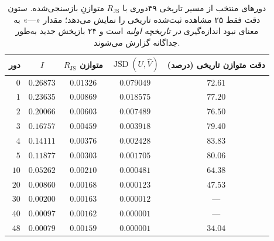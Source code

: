 \begin{table}[htbp]
\centering\small
\caption{دورهای منتخب از مسیر تاریخی ۴۹دوری با $R_{\mathrm{JS}}$ متوازنِ بازسنجی‌شده. ستون دقت فقط ۲۵ مشاهده ثبت‌شده تاریخی را نمایش می‌دهد؛ مقدار «---» به معنای نبود اندازه‌گیری \emph{در تاریخچه اولیه} است و ۲۴ بازپخش جدید به‌طور جداگانه گزارش می‌شوند.}
\label{tab:ch4-center-trajectory-selected}
\begin{tabular}{rcccc}\hline
دور & $I$ & $R_{\mathrm{JS}}$ متوازن & $\overline{\operatorname{JSD}}(U,\widehat V)$ & دقت متوازن تاریخی (درصد)\\\hline
$0$ & $0.26873$ & $0.01326$ & $0.079049$ & $72.61$\\
$1$ & $0.23635$ & $0.00869$ & $0.018575$ & $77.20$\\
$2$ & $0.20066$ & $0.00603$ & $0.007489$ & $76.50$\\
$3$ & $0.16757$ & $0.00459$ & $0.003918$ & $79.40$\\
$4$ & $0.14111$ & $0.00376$ & $0.002428$ & $83.83$\\
$5$ & $0.11877$ & $0.00303$ & $0.001705$ & $80.06$\\
$10$ & $0.05262$ & $0.00210$ & $0.000481$ & $64.38$\\
$20$ & $0.00860$ & $0.00168$ & $0.000123$ & $47.53$\\
$30$ & $0.00200$ & $0.00163$ & $0.000012$ & ---\\
$40$ & $0.00097$ & $0.00162$ & $0.000001$ & ---\\
$48$ & $0.00079$ & $0.00159$ & $0.000001$ & $34.04$\\
\hline
\end{tabular}
\end{table}
